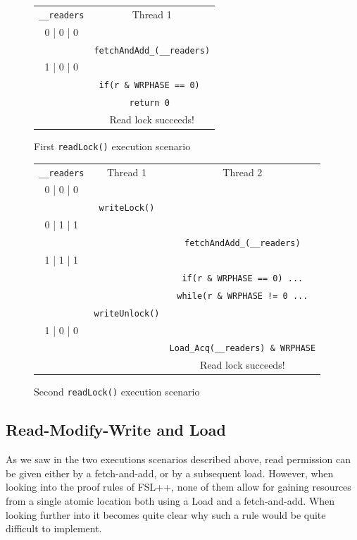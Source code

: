 \begin{figure}
\begin{tabular}{c||c}
	\texttt{\_\_readers} & Thread 1\\
	0 | 0 | 0 & \\
	 &   \texttt{fetchAndAdd\_(\_\_readers)} \\
	1 | 0 | 0 & \\
	 & \texttt{if(r \& WRPHASE == 0) } \\
	& \texttt{return 0 } \\
	&  Read lock succeeds!
\end{tabular}

		\caption{First \texttt{readLock()} execution scenario}
		\label{fig:scen1}
\end{figure}
\begin{figure}
\begin{tabular}{c||c|c}
	\texttt{\_\_readers} & Thread 1 & Thread 2 \\
	0 | 0 | 0 & & \\
	 & \texttt{writeLock()} & \\
	0 | 1 | 1 &   & \\
	 &   & \texttt{fetchAndAdd\_(\_\_readers)} \\
	1 | 1 | 1 & & \\
		& & \texttt{if(r \& WRPHASE == 0) ...} \\
		& & \texttt{while(r \& WRPHASE != 0 ...} \\
	 & \texttt{writeUnlock()} & \\
		1 | 0 | 0 & & \\
		& & \texttt{Load\_Acq(\_\_readers) \& WRPHASE} \\
		& & Read lock succeeds!
\end{tabular}

		\caption{Second \texttt{readLock()} execution scenario}
		\label{fig:scen2}
\end{figure}


		\subsection{Read-Modify-Write and Load}
	\label{subsec:glibcRWPb}
As we saw in the two executions scenarios described above, read permission can be given either by a fetch-and-add, or by a subsequent load. However, when looking into the proof rules of FSL++, none of them allow for gaining resources from a single atomic location both using a Load and a fetch-and-add. When looking further into it becomes quite clear why such a rule would be quite difficult to implement.

